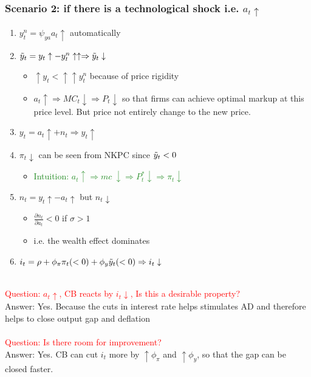 \documentclass{article}
\begin{document}
\subsubsection{Scenario 2: if there is a technological shock i.e. $a_t \uparrow$}
\begin{enumerate}
    \item $y_t^n = \psi_{ya}a_t\uparrow$ automatically
    \item $\Tilde{y}_t = y_t \uparrow - y_t^n\uparrow\uparrow \Rightarrow \Tilde{y}_t \downarrow$
    \begin{itemize}
        \item $\uparrow y_t < \uparrow\uparrow y_t^n$ because of price rigidity
        \item $a_t \uparrow \Rightarrow MC_t \downarrow \Rightarrow P_t \downarrow$ so that firms can achieve optimal markup at this price level. But price not entirely change to the new price.
    \end{itemize}
    \item $y_t = a_t \uparrow + n_t \Rightarrow y_t \uparrow$
    \item $\pi_t \downarrow$ can be seen from NKPC since $\Tilde{y}_t < 0$
    \begin{itemize}
        \item \textcolor{ForestGreen}{Intuition: $a_t \uparrow \Rightarrow mc\ \downarrow \Rightarrow P_t^*\downarrow \Rightarrow \pi_t \downarrow$}
    \end{itemize}
    \item $n_t = y_t \uparrow - a_t \uparrow$ but $n_t \downarrow$
    \begin{itemize}
        \item $\frac{\partial n_t}{\partial a_t} < 0$ if $\sigma > 1$
        \item i.e. the wealth effect dominates
    \end{itemize}
    \item $i_t = \rho + \phi_\pi \pi_t(<0) + \phi_y \Tilde{y}_t (<0) \Rightarrow i_t \downarrow$
\end{enumerate}
\\
\textcolor{red}{Question: $a_t \uparrow$, CB reacts by $i_t \downarrow$, Is this a desirable property?}\\
{\color{red}Answer: Yes. Because the cuts in interest rate helps stimulates AD and therefore helps to close output gap and deflation}\\
\\
\textcolor{red}{Question: Is there room for improvement?}\\
{\color{red}Answer: Yes. CB can cut $i_t$ more by $\uparrow \phi_\pi$ and $\uparrow \phi_y$, so that the gap can be closed faster.} 
\end{document}
